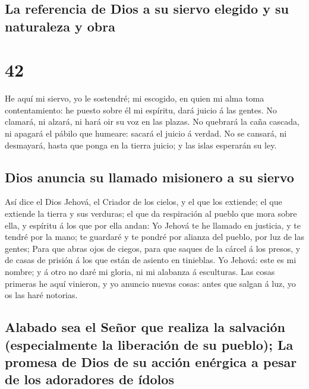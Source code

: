 \hypertarget{la-referencia-de-dios-a-su-siervo-elegido-y-su-naturaleza-y-obra}{%
\subsection{La referencia de Dios a su siervo elegido y su naturaleza y
obra}\label{la-referencia-de-dios-a-su-siervo-elegido-y-su-naturaleza-y-obra}}

\hypertarget{section-41}{%
\section{42}\label{section-41}}

 He aquí mi siervo, yo le sostendré; mi escogido, en quien
mi alma toma contentamiento: he puesto sobre él mi espíritu, dará juicio
á las gentes.  No clamará, ni alzará, ni hará oir su voz en
las plazas.  No quebrará la caña cascada, ni apagará el
pábilo que humeare: sacará el juicio á verdad.  No se
cansará, ni desmayará, hasta que ponga en la tierra juicio; y las islas
esperarán su ley.

\hypertarget{dios-anuncia-su-llamado-misionero-a-su-siervo}{%
\subsection{Dios anuncia su llamado misionero a su
siervo}\label{dios-anuncia-su-llamado-misionero-a-su-siervo}}

 Así dice el Dios Jehová, el Criador de los cielos, y el que
los extiende; el que extiende la tierra y sus verduras; el que da
respiración al pueblo que mora sobre ella, y espíritu á los que por ella
andan:  Yo Jehová te he llamado en justicia, y te tendré por
la mano; te guardaré y te pondré por alianza del pueblo, por luz de las
gentes;  Para que abras ojos de ciegos, para que saques de
la cárcel á los presos, y de casas de prisión á los que están de asiento
en tinieblas.  Yo Jehová: este es mi nombre; y á otro no
daré mi gloria, ni mi alabanza á esculturas.  Las cosas
primeras he aquí vinieron, y yo anuncio nuevas cosas: antes que salgan á
luz, yo os las haré notorias.

\hypertarget{alabado-sea-el-seuxf1or-que-realiza-la-salvaciuxf3n-especialmente-la-liberaciuxf3n-de-su-pueblo-la-promesa-de-dios-de-su-acciuxf3n-enuxe9rgica-a-pesar-de-los-adoradores-de-uxeddolos}{%
\subsection{Alabado sea el Señor que realiza la salvación (especialmente
la liberación de su pueblo); La promesa de Dios de su acción enérgica a
pesar de los adoradores de
ídolos}\label{alabado-sea-el-seuxf1or-que-realiza-la-salvaciuxf3n-especialmente-la-liberaciuxf3n-de-su-pueblo-la-promesa-de-dios-de-su-acciuxf3n-enuxe9rgica-a-pesar-de-los-adoradores-de-uxeddolos}}

